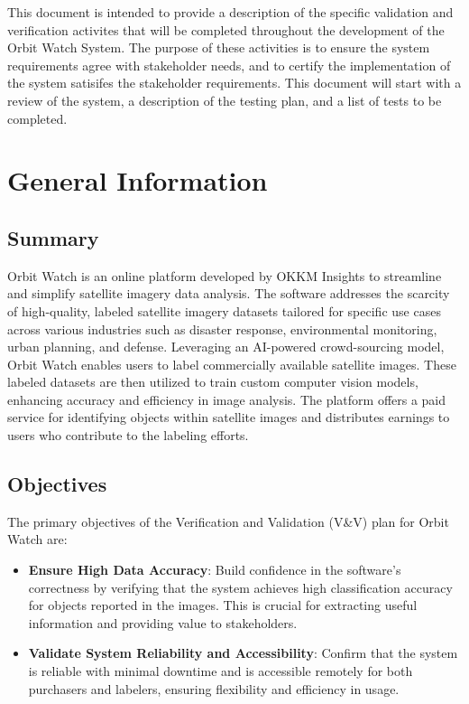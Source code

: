 \documentclass[12pt, titlepage]{article}
\begin{document}
\newpage


This document is intended to provide a description of the specific validation and verification activites that will be completed throughout the development of the Orbit Watch System.
The purpose of these activities is to ensure the system requirements agree with stakeholder needs, and to certify the implementation of the system satisifes the stakeholder requirements. This document will
start with a review of the system, a description of the testing plan, and a list of tests to be completed.


  \section{General Information}

  \subsection{Summary} \cite{Problem_Statement}
  
  Orbit Watch is an online platform developed by OKKM Insights to streamline and simplify satellite imagery data analysis. The software addresses the scarcity of high-quality, labeled satellite imagery datasets tailored for specific use cases across various industries such as disaster response, environmental monitoring, urban planning, and defense. Leveraging an AI-powered crowd-sourcing model, Orbit Watch enables users to label commercially available satellite images. These labeled datasets are then utilized to train custom computer vision models, enhancing accuracy and efficiency in image analysis. The platform offers a paid service for identifying objects within satellite images and distributes earnings to users who contribute to the labeling efforts.
  
  \subsection{Objectives} \cite{Problem_Statement}
  
  The primary objectives of the Verification and Validation (V\&V) plan for Orbit Watch are:
  
  \begin{itemize}
      \item \textbf{Ensure High Data Accuracy}: Build confidence in the software's correctness by verifying that the system achieves high classification accuracy for objects reported in the images. This is crucial for extracting useful information and providing value to stakeholders.
      \item \textbf{Validate System Reliability and Accessibility}: Confirm that the system is reliable with minimal downtime and is accessible remotely for both purchasers and labelers, ensuring flexibility and efficiency in usage.
  \end{itemize}
  
\end{document}
